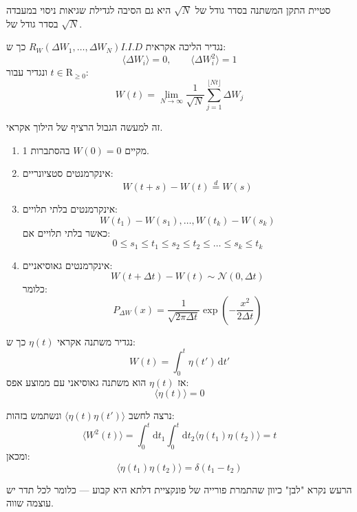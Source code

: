 \documentclass{tstextbook}
\begin{document}
\begin{remark}
סטיית התקן המשתנה בסדר גודל של \(\sqrt{N}\) היא גם הסיבה לגדילת שגיאות ניסוי במעבדה בסדר גודל של \(\sqrt{ N }\).

\end{remark}
\begin{definition}
נגדיר הליכה אקראית \(I.I.D\)\(R_W(\Delta W_1, \dots, \Delta W_N)\) כך ש:\\
$$\langle \Delta W_i \rangle = 0, \qquad \langle \Delta W_i^2 \rangle = 1$$
ונגדיר עבור \(t \in \mathrm{R}_{\geq 0}\):
$$W(t) = \lim_{N \to \infty} \frac{1}{\sqrt{N}} \sum_{j=1}^{\lfloor Nt \rfloor} \Delta W_j$$

\end{definition}
\begin{remark}
זה למעשה הגבול הרציף של הילוך אקראי.

\end{remark}
\begin{proposition}
  \begin{enumerate}
    \item מקיים \(W(0) = 0\) בהסתברות 1. 


    \item אינקרמנטים סטציונריים:  \\
$$W(t+s)-W(t) \overset{d}{=} W(s)$$


    \item אינקרמנטים בלתי תלויים: \\
$$W(t_1)-W(s_1), \dots, W(t_k)-W(s_k)$$
כאשר בלתי תלויים אם:
$$0 \leq s_1 \leq t_1 \leq s_2 \leq t_2 \leq \dots \leq s_k \leq t_k$$


    \item אינקרמנטים גאוסיאניים: \\
$$W(t+\Delta t) - W(t) \sim \mathcal{N}(0, \Delta t)$$
כלומר:\\
$$P_{\Delta W}(x) = \frac{1}{\sqrt{2\pi \Delta t}} \exp\left( -\frac{x^2}{2\Delta t} \right)$$


  \end{enumerate}
\end{proposition}
\begin{definition}
נגדיר משתנה אקראי \(\eta(t)\) כך ש:\\
$$W(t) = \int_0^t \eta(t') \,\mathrm{d}t'$$
אז \(\eta(t)\) הוא משתנה גאוסיאני עם ממוצע אפס:
$$\langle \eta(t) \rangle = 0$$

\end{definition}
\begin{proposition}
נרצה לחשב \(\langle \eta(t)\eta(t') \rangle\) ונשתמש בזהות:\\
$$\langle W^2(t) \rangle = \int_0^t \mathrm{d}t_1 \int_0^t \mathrm{d}t_2 \langle \eta(t_1) \eta(t_2) \rangle = t$$
ומכאן: 
$$\langle \eta(t_1) \eta(t_2) \rangle = \delta(t_1 - t_2)$$

\end{proposition}
\begin{remark}
הרעש נקרא "לבן" כיוון שהתמרת פורייה של פונקציית דלתא היא קבוע — כלומר לכל תדר יש עוצמה שווה.

\end{remark}
\end{document}
